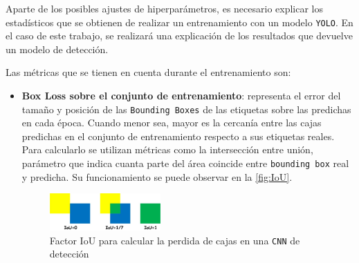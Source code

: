 \clearpage
Aparte de los posibles ajustes de hiperparámetros, es necesario explicar los estadísticos que se obtienen de realizar un entrenamiento con un modelo \texttt{YOLO}. En el caso de este trabajo, se realizará una 
explicación de los resultados que devuelve un modelo de detección.

Las métricas que se tienen en cuenta durante el entrenamiento son:

\begin{itemize}
    \item \textbf{Box Loss sobre el conjunto de entrenamiento}: representa el error del tamaño y posición de las \texttt{Bounding Boxes} de las etiquetas sobre las predichas en cada época. Cuando menor sea, 
    mayor es la cercanía entre las cajas predichas en el conjunto de entrenamiento respecto a sus etiquetas reales.\newline 
    Para calcularlo se utilizan métricas como la intersección entre unión, parámetro que indica cuanta parte del área coincide entre \texttt{bounding box} real y predicha. Su funcionamiento se puede observar 
    en la \autoref{fig:IoU}.

    \begin{figure}[H]
        \centering
        \includegraphics[width=0.4\textwidth]{images/13/a/IoU.png}
        \caption{Factor IoU para calcular la perdida de cajas en una \texttt{CNN} de detección}
        \label{fig:IoU}
    \end{figure}


\end{itemize}
